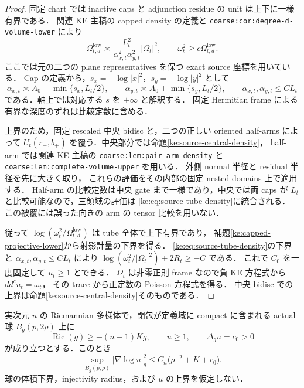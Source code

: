 \begin{proof}
固定 chart では inactive caps と adjunction residue の unit は上下に一様有界である．
関連 KE 主稿の capped density の定義と
\texttt{coarse:cor:degree-d-volume-lower} により
\[
 \Omega_{t,d}^{\mathrm{low}}\asymp
 \frac{L_t^2}{\alpha_{x,t}^2\alpha_{y,t}^2}|\Omega_t|^2,
 \qquad \omega_t^2\ge c\Omega_{t,d}^{\mathrm{low}}.
\]
ここでは元の二つの plane representatives を保つ exact source 座標を用いている．
Cap の定義から，$s_x=-\log|x|^2$，$s_y=-\log|y|^2$ として
\begin{equation}\label{ke:eq:source-cap-depth}
 \alpha_{x,t}\asymp A_0+\min\{s_x,L_t/2\},\qquad
 \alpha_{y,t}\asymp A_0+\min\{s_y,L_t/2\},
 \qquad \alpha_{x,t},\alpha_{y,t}\le C L_t
\end{equation}
である．軸上では対応する $s$ を $+\infty$ と解釈する．
固定 Hermitian frame による有界な深度のずれは比較定数に含める．

上界のため，固定 rescaled 中央 bidisc と，二つの正しい oriented half-arms
によって $U_t(r_+,b_+)$ を覆う．中央部分では命題\ref{ke:source-central-density}，
half-arm では関連 KE 主稿の
\texttt{coarse:lem:pair-arm-density} と
\texttt{coarse:lem:complete-volume-upper} を用いる．
外側 normal 半径と residual 半径を先に大きく取り，
これらの評価をその内部の固定 nested domains 上で適用する．
Half-arm の比較定数は中央 gate まで一様であり，中央では両 caps が
$L_t$ と比較可能なので，三領域の評価は
\eqref{ke:eq:source-tube-density}に統合される．
この被覆には誤った向きの arm の tensor 比較を用いない．

従って $\log(\omega_t^2/\Omega_{t,d}^{\mathrm{low}})$ は tube 全体で上下有界であり，
補題\ref{ke:capped-projective-lower}から射影計量の下界を得る．
\eqref{ke:eq:source-tube-density}の下界と
$\alpha_{x,t},\alpha_{y,t}\le CL_t$ により
$\log(\omega_t^2/|\Omega_t|^2)+2R_t\ge-C$ である．
これで $C_0$ を一度固定して $u_t\ge1$ とできる．
$\Omega_t$ は非零正則 frame なので負 KE 方程式から $dd^c u_t=\omega_t$，
その trace から正定数の Poisson 方程式を得る．
中央 bidisc での上界は命題\ref{ke:source-central-density}そのものである．
\end{proof}

\begin{lemma}
\label{ke:positive-poisson-log-gradient}
実次元 $n$ の Riemannian 多様体で，閉包が定義域に compact に含まれる actual 球
$B_g(p,2\rho)$ 上に
\[
 \operatorname{Ric}(g)\ge-(n-1)K g,\qquad
 u\ge1,\qquad \Delta_g u=c_0>0
\]
が成り立つとする．このとき
\begin{equation}\label{ke:eq:positive-poisson-log-gradient}
 \sup_{B_g(p,\rho)}|\nabla\log u|_g^2
 \le C_n\bigl(\rho^{-2}+K+c_0\bigr).
\end{equation}
球の体積下界，injectivity radius，および $u$ の上界を仮定しない．
\end{lemma}

